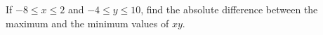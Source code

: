 If $-8\le x\le2$ and $-4\le y\le10$, find the absolute difference between the maximum and the minimum values of $xy$.
